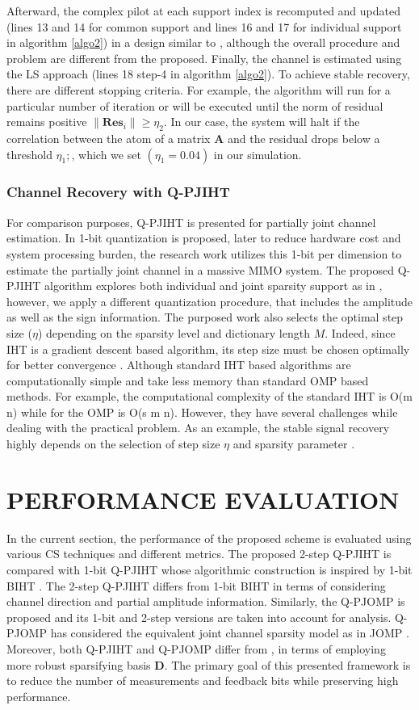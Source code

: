Afterward, the complex pilot at each support index is recomputed and updated (lines 13 and 14 for common support and lines 16 and 17 for individual support in algorithm \ref{algo2}) in a design similar to  \cite{qomp}, although the overall procedure and problem are different from the proposed.
Finally, the channel is estimated using the LS approach (lines 18 step-4 in algorithm \ref{algo2}). 
To achieve stable recovery, there are different stopping criteria. For example, the algorithm will run for a particular number of iteration or will be executed until the norm of residual remains positive $\| \mathbf{Res}_i\| \ge \eta_2 $. In our case, the system will halt if the correlation between the atom of a matrix \textbf{A} and the residual drops below a threshold $\eta_1;$, which we set $(\eta_1= 0.04)$ in our simulation.
\subsubsection{Channel Recovery with Q-PJIHT}
For comparison purposes, Q-PJIHT is presented for partially joint channel estimation. In \cite{BIHT} 1-bit quantization is proposed, later to reduce hardware cost and system processing burden, the research work \cite{mainref-1bit} utilizes this 1-bit per dimension to estimate the partially joint channel in a massive MIMO system. 
The proposed Q-PJIHT algorithm explores both individual and  joint sparsity support as in \cite{mainref-1bit}, however, we apply a different quantization procedure, that includes the amplitude as well as the sign information. The purposed work also selects the optimal step size ($\eta$) depending on the sparsity level and dictionary length $ M$. Indeed, since IHT is a gradient descent based algorithm, its step size must be chosen optimally for better convergence \cite{Aiht}. Although standard IHT based algorithms are computationally simple and take less memory than standard OMP based methods.  For example, the computational complexity of the standard IHT is O(m n) while for the OMP is O(s m n). However, they have several challenges while dealing with the practical problem. As an example, the stable signal recovery highly depends on the selection of step size $\eta$ and sparsity parameter \cite{Aiht}.
 \section{PERFORMANCE EVALUATION} 
In the current section, the performance of the proposed scheme is evaluated using various CS techniques and different metrics. The proposed 2-step Q-PJIHT is compared with 1-bit Q-PJIHT whose algorithmic construction is inspired by 1-bit BIHT \cite{mainref-1bit}. The 2-step Q-PJIHT differs from 1-bit BIHT in terms of considering channel direction and partial amplitude information. Similarly, the Q-PJOMP is proposed and its 1-bit and 2-step versions are taken into account for analysis. Q-PJOMP has considered the equivalent joint channel sparsity model as in  JOMP \cite{mainref-joint}. Moreover, both Q-PJIHT and  Q-PJOMP differ from \cite{mainref-joint}, \cite{mainref-1bit} in terms of employing more robust sparsifying basis $\mathbf{D}$. The primary goal of this presented framework is to reduce the number of measurements and feedback bits while preserving high performance.  
